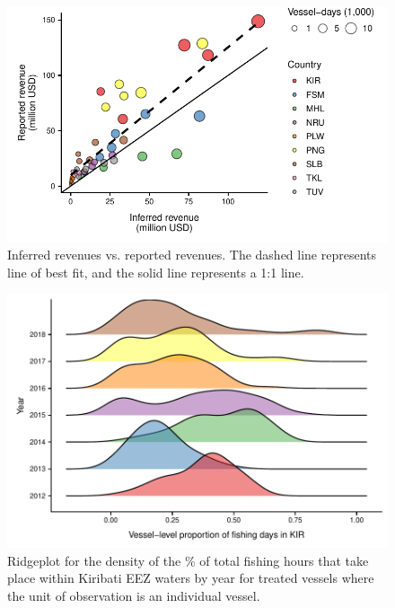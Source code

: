 \documentclass[9p,twocolumn,twoside,lineno]{pnas-new}
\begin{document}
\begin{figure}
\centering
	\includegraphics{img/revenue_FFA_GFW_linear.pdf}
	\caption{\label{fig:revenue_FFA_GFW_linear}Inferred revenues vs. reported revenues. The dashed line represents line of best fit, and the solid line represents a 1:1 line.}
\end{figure}

\begin{figure}
\centering
	\includegraphics{img/hist_kir_fishing.pdf}
	\caption{\label{fig:hist_kir_fishing}Ridgeplot for the density of the \% of total fishing hours that take place within Kiribati EEZ waters by year for treated vessels where the unit of observation is an individual vessel.}	
\end{figure}
\end{document}
